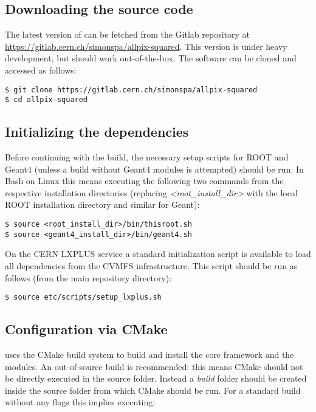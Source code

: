 \subsection{Downloading the source code}
The latest version of \apsq can be fetched from the Gitlab repository at \url{https://gitlab.cern.ch/simonspa/allpix-squared}. This version is under heavy development, but should work out-of-the-box. The software can be cloned and accessed as follows:

\begin{verbatim}
$ git clone https://gitlab.cern.ch/simonspa/allpix-squared
$ cd allpix-squared
\end{verbatim}

\subsection{Initializing the dependencies}
\label{sec:initialize_dependencies}
Before continuing with the build, the necessary setup scripts for ROOT and Geant4 (unless a build without Geant4 modules is attempted) should be run. In Bash on Linux this means executing the following two commands from the respective installation directories (replacing \textit{\textless root\_install\_dir\textgreater} with the local ROOT installation directory and similar for Geant):
\begin{verbatim}
$ source <root_install_dir>/bin/thisroot.sh
$ source <geant4_install_dir>/bin/geant4.sh
\end{verbatim}

On the CERN LXPLUS service a standard initialization script is available to load all dependencies from the CVMFS infrastructure. This script should be run as follows (from the main repository directory):
\begin{verbatim}
$ source etc/scripts/setup_lxplus.sh
\end{verbatim}

\subsection{Configuration via CMake}
\label{sec:cmake_config}
\apsq uses the CMake build system to build and install the core framework and the modules. An out-of-source build is recommended: this means CMake should not be directly executed in the source folder. Instead a \textit{build} folder should be created inside the source folder from which CMake should be run. For a standard build without any flags this implies executing:

